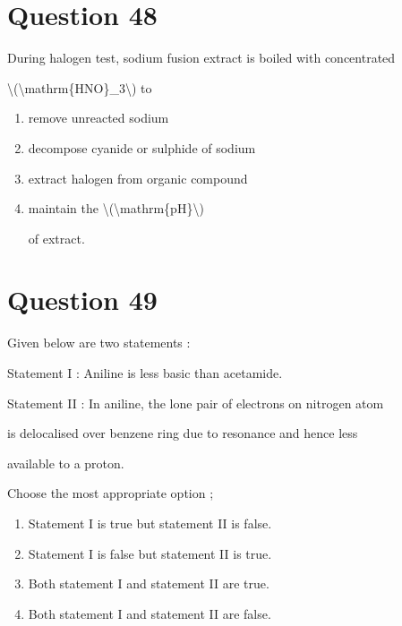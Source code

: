 \documentclass{article}
\begin{document}
\section*{Question 48}
During halogen test, sodium fusion extract is boiled with concentrated

\textbackslash(\textbackslash mathrm\{HNO\}\_3\textbackslash) to


\begin{enumerate}[label=(\alph*)]
\item remove unreacted sodium


\item decompose cyanide or sulphide of sodium


\item extract halogen from organic compound


\item maintain the \textbackslash(\textbackslash mathrm\{pH\}\textbackslash)

of extract.


\end{enumerate}
\newpage
\section*{Question 49}
Given below are two statements :



Statement I : Aniline is less basic than acetamide.



Statement II : In aniline, the lone pair of electrons on nitrogen atom

is delocalised over benzene ring due to resonance and hence less

available to a proton.



Choose the most appropriate option ;


\begin{enumerate}[label=(\alph*)]
\item Statement I is true but statement II is false.


\item Statement I is false but statement II is true.


\item Both statement I and statement II are true.


\item Both statement I and statement II are false.


\end{enumerate}
\newpage
\end{document}
